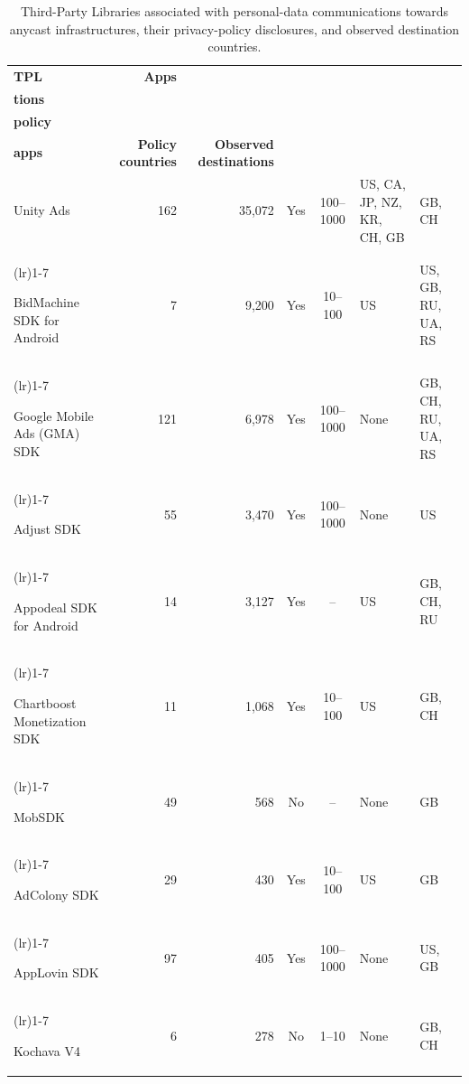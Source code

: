 \documentclass[
A4paper,                %
twoside,                %
openright,              %
chapterprefix=true,     %
12pt,                   %
headings=normal,        %
titlepage=on            %
]{book}
\newcommand{\rowsep}[1]{%
    \arrayrulecolor{black!30}%
    \cmidrule[0.3pt](lr){1-#1}%
    \arrayrulecolor{black}%
}
\begin{document}
\begin{table}[ht]
    \centering
    \footnotesize
    \setlength{\tabcolsep}{4pt}
    \caption{Third-Party Libraries associated with personal-data communications towards anycast infrastructures, their privacy-policy disclosures, and observed destination countries.}
    \label{tab:anycast_tpls_privacy_destinations}
    \begin{tabularx}{\textwidth}{>{\raggedright\arraybackslash}p{3.3cm} r r c c >{\raggedright\arraybackslash}X >{\raggedright\arraybackslash}X}
        \toprule
        \textbf{TPL} &
        \textbf{Apps} &
        \begin{tabular}[b]{@{}r@{}}\textbf{Connec-}\\\textbf{tions}\end{tabular} &
        \begin{tabular}[b]{@{}c@{}}\textbf{Privacy}\\\textbf{policy}\end{tabular} &
        \begin{tabular}[b]{@{}c@{}}\textbf{10M+}\\\textbf{apps}\end{tabular} &
        \textbf{Policy countries} &
        \textbf{Observed destinations} \\
        \midrule
        Unity Ads & 162 & 35,072 & Yes & 100--1000 & US, CA, JP, NZ, KR, CH, GB & GB, CH \\
        \rowsep{7}
        BidMachine SDK for Android & 7 & 9,200 & Yes & 10--100 & US & US, GB, RU, UA, RS \\
        \rowsep{7}
        Google Mobile Ads (GMA) SDK & 121 & 6,978 & Yes & 100--1000 & None & GB, CH, RU, UA, RS \\
        \rowsep{7}
        Adjust SDK & 55 & 3,470 & Yes & 100--1000 & None & US \\
        \rowsep{7}
        Appodeal SDK for Android & 14 & 3,127 & Yes & -- & US & GB, CH, RU \\
        \rowsep{7}
        Chartboost Monetization SDK & 11 & 1,068 & Yes & 10--100 & US & GB, CH \\
        \rowsep{7}
        MobSDK & 49 & 568 & No & -- & None & GB \\
        \rowsep{7}
        AdColony SDK & 29 & 430 & Yes & 10--100 & US & GB \\
        \rowsep{7}
        AppLovin SDK & 97 & 405 & Yes & 100--1000 & None & US, GB \\
        \rowsep{7}
        Kochava V4 & 6 & 278 & No & 1--10 & None & GB, CH \\

\end{tabularx}
\end{table}
\end{document}
